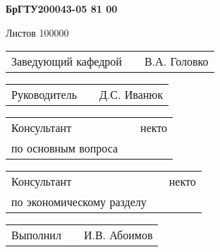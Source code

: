 \documentclass[a4paper]{article}
\begin{document}
\vspace{32pt}

\begin{Center}{
\cyrillicfontsf 
\englishfontsf
\bfseries
\fontsize{16pt}{0pt}\selectfont 
    БрГТУ200043-05 81 00
}\end{Center}

\vspace{22pt}

\begin{Center}{
\cyrillicfontsf 
\englishfontsf
\fontsize{16pt}{0pt}\selectfont 
    Листов 100000
}\end{Center}

\vspace{22pt}

\begin{FlushLeft} {
\cyrillicfontsf 
\englishfontsf
\fontsize{14pt}{0pt}\selectfont 

  \begin{tabular}{p{6.5cm} p{4.767cm} p{5.633cm}}
    \raggedleft Заведующий кафедрой & & В.А. Головко  
  \end{tabular}

  \vspace{14pt}
  
  \begin{tabular}{p{6.5cm} p{4.767cm} p{5.633cm}}
    \raggedleft Руководитель & & Д.С. Иванюк \\ 
  \end{tabular}

  \vspace{14pt}

  \begin{tabular}{p{6.5cm} p{4.767cm} p{5.633cm}}
    \raggedleft Консультант & & некто \\
    \raggedleft по основным вопроса & &
  \end{tabular}

  \vspace{14pt}

  \begin{tabular}{p{6.5cm} p{4.767cm} p{5.633cm}}
    \raggedleft Консультант & & некто \\
    \raggedleft по экономическому разделу & &
  \end{tabular}

  \vspace{14pt}

  \begin{tabular}{p{6.5cm} p{4.767cm} p{5.633cm}}
    \raggedleft Выполнил & & И.В. Абоимов \\
  \end{tabular}

}
\end{FlushLeft}
\end{document}
